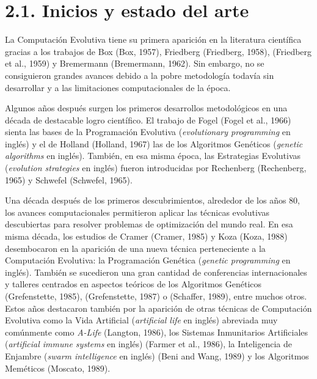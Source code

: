 \documentclass[spanish,a4paper,12pt,twoside]{report}
\begin{document}
  \section*{\Large 2.1. Inicios y estado del arte}
  La Computación Evolutiva tiene su primera aparición en la literatura científica gracias a los trabajos de Box (Box, 1957),  Friedberg (Friedberg, 1958), (Friedberg et al., 1959) y Bremermann (Bremermann, 1962). Sin embargo, no se consiguieron grandes avances debido a la pobre metodología todavía sin desarrollar y a las limitaciones computacionales de la época. \par
  Algunos años después surgen los primeros desarrollos metodológicos en una década de destacable logro científico. El trabajo de Fogel (Fogel et al., 1966) sienta las bases de la Programación Evolutiva (\emph{evolutionary programming} en inglés) y el de Holland (Holland, 1967) las de los Algoritmos Genéticos (\emph{genetic algorithms} en inglés). También, en esa misma época, las Estrategias Evolutivas (\emph{evolution strategies} en inglés) fueron introducidas por Rechenberg (Rechenberg, 1965) y Schwefel (Schwefel, 1965). \par
  Una década después de los primeros descubrimientos, alrededor de los años 80, los avances computacionales permitieron aplicar las técnicas evolutivas descubiertas para resolver problemas de optimización del mundo real. En esa misma década, los estudios de Cramer (Cramer, 1985) y Koza (Koza, 1988) desembocaron en la aparición de una nueva técnica perteneciente a la Computación Evolutiva: la Programación Genética (\emph{genetic programming} en inglés). También se sucedieron una gran cantidad de conferencias internacionales y talleres centrados en aspectos teóricos de los Algoritmos Genéticos (Grefenstette, 1985), (Grefenstette, 1987) o (Schaffer, 1989), entre muchos otros. Estos años destacaron también por la aparición de otras técnicas de Computación Evolutiva como la Vida Artificial (\emph{artificial life} en inglés) abreviada muy comúnmente como \emph{A-Life} (Langton, 1986), los Sistemas Inmunitarios Artificiales (\emph{artificial immune systems} en inglés) (Farmer et al., 1986), la Inteligencia de Enjambre (\emph{swarm intelligence} en inglés) (Beni and Wang, 1989) y los Algoritmos Meméticos (Moscato, 1989). \par
\end{document}
